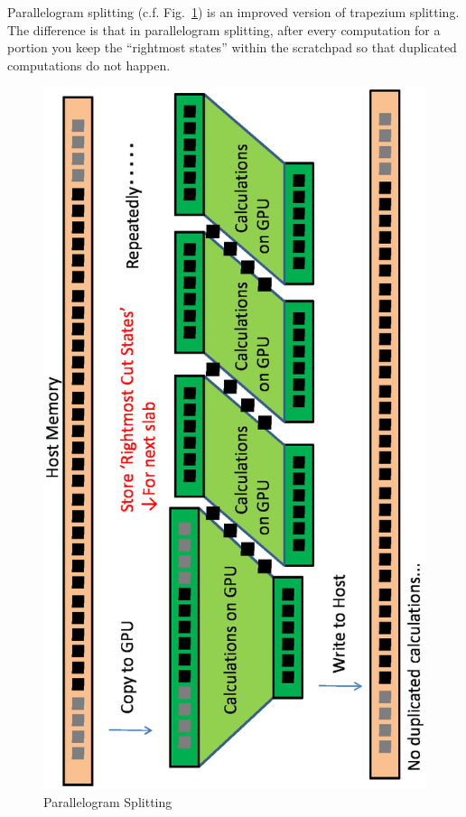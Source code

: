 \documentclass[twocolumn]{article}
\begin{document}
Parallelogram splitting (c.f. Fig.~\ref{FigureParallelogram}) is an improved
version of trapezium splitting. The difference is that in parallelogram
splitting, after every computation for a portion you keep the ``rightmost
states'' within the scratchpad so that duplicated computations do not happen.

\begin{figure}
  \includegraphics[scale=0.5,angle=270]{figure/parallelogram.eps}
  \caption{Parallelogram Splitting}\label{FigureParallelogram}
\end{figure}
\end{document}
